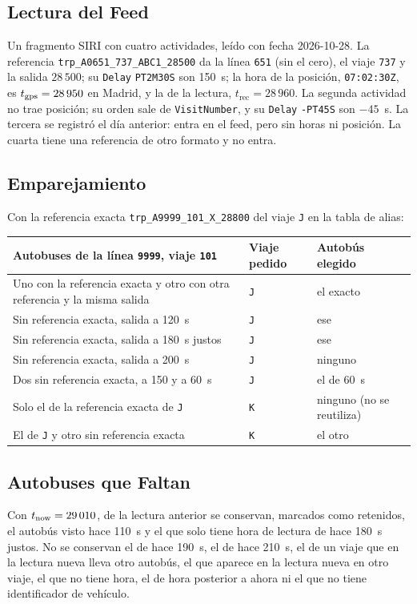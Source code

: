 \subsection{Lectura del Feed} Un fragmento SIRI con cuatro actividades, leído con fecha 2026-10-28. La referencia
\texttt{trp\_A0651\_737\_ABC1\_28500} da la línea \texttt{651} (sin el cero), el viaje \texttt{737} y la salida
$28\,500$; su \texttt{Delay} \texttt{PT2M30S} son 150~s; la hora de la posición, \texttt{07:02:30Z}, es
$t_{\mathrm{gps}}=28\,950$ en Madrid, y la de la lectura, $t_{\mathrm{rec}}=28\,960$. La segunda actividad no trae posición; su
orden sale de \texttt{VisitNumber}, y su \texttt{Delay} \texttt{-PT45S} son $-45$~s. La tercera se registró el día
anterior: entra en el feed, pero sin horas ni posición. La cuarta tiene una referencia de otro formato y no entra.

\subsection{Emparejamiento} Con la referencia exacta \texttt{trp\_A9999\_101\_X\_28800} del viaje \texttt{J} en la tabla de
alias:

\begin{center}
\small
\begin{tabularx}{\textwidth}{@{}>{\raggedright\arraybackslash}X l l@{}}
\toprule
Autobuses de la línea \texttt{9999}, viaje \texttt{101} & Viaje pedido & Autobús elegido\\
\midrule
Uno con la referencia exacta y otro con otra referencia y la misma salida & \texttt{J} & el exacto\\
Sin referencia exacta, salida a 120~s & \texttt{J} & ese\\
Sin referencia exacta, salida a 180~s justos & \texttt{J} & ese\\
Sin referencia exacta, salida a 200~s & \texttt{J} & ninguno\\
Dos sin referencia exacta, a 150 y a 60~s & \texttt{J} & el de 60~s\\
Solo el de la referencia exacta de \texttt{J} & \texttt{K} & ninguno (no se reutiliza)\\
El de \texttt{J} y otro sin referencia exacta & \texttt{K} & el otro\\
\bottomrule
\end{tabularx}
\end{center}

\subsection{Autobuses que Faltan} Con $t_{\mathrm{now}}=29\,010$, de la lectura anterior se conservan, marcados como retenidos,
el autobús visto hace 110~s y el que solo tiene hora de lectura de hace 180~s justos. No se conservan el de hace 190~s,
el de hace 210~s, el de un viaje que en la lectura nueva lleva otro autobús, el que aparece en la lectura nueva en otro
viaje, el que no tiene hora, el de hora posterior a ahora ni el que no tiene identificador de vehículo.

